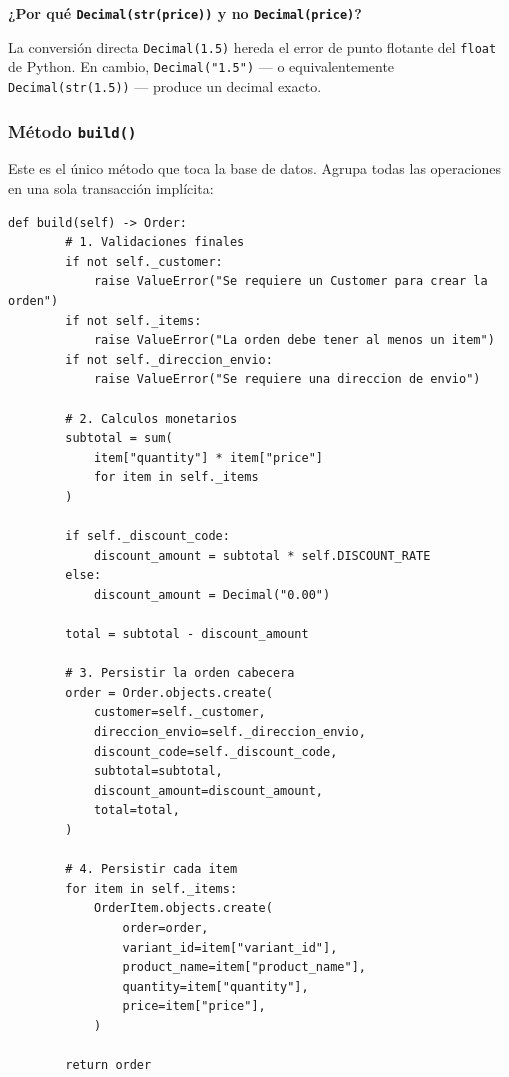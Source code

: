 \documentclass[12pt, a4paper]{article}
\begin{document}
\textbf{¿Por qué \texttt{Decimal(str(price))} y no \texttt{Decimal(price)}?}

La conversión directa \texttt{Decimal(1.5)} hereda el error de punto flotante del \texttt{float} de Python. En cambio, \texttt{Decimal("1.5")} — o equivalentemente \texttt{Decimal(str(1.5))} — produce un decimal exacto.

\subsubsection{Método \texttt{build()}}

Este es el único método que toca la base de datos. Agrupa todas las operaciones en una sola transacción implícita:

\begin{lstlisting}[caption={orders/domain/builders.py — método build()}]
    def build(self) -> Order:
        # 1. Validaciones finales
        if not self._customer:
            raise ValueError("Se requiere un Customer para crear la orden")
        if not self._items:
            raise ValueError("La orden debe tener al menos un item")
        if not self._direccion_envio:
            raise ValueError("Se requiere una direccion de envio")

        # 2. Calculos monetarios
        subtotal = sum(
            item["quantity"] * item["price"]
            for item in self._items
        )

        if self._discount_code:
            discount_amount = subtotal * self.DISCOUNT_RATE
        else:
            discount_amount = Decimal("0.00")

        total = subtotal - discount_amount

        # 3. Persistir la orden cabecera
        order = Order.objects.create(
            customer=self._customer,
            direccion_envio=self._direccion_envio,
            discount_code=self._discount_code,
            subtotal=subtotal,
            discount_amount=discount_amount,
            total=total,
        )

        # 4. Persistir cada item
        for item in self._items:
            OrderItem.objects.create(
                order=order,
                variant_id=item["variant_id"],
                product_name=item["product_name"],
                quantity=item["quantity"],
                price=item["price"],
            )

        return order
\end{lstlisting}
\end{document}
